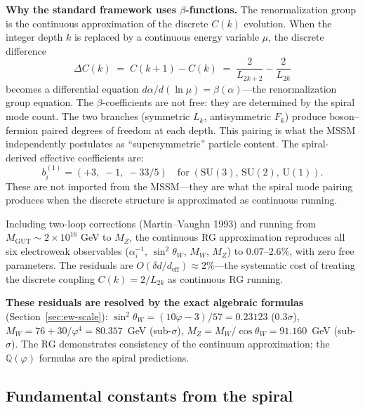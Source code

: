 \documentclass[12pt,a4paper]{article}
\begin{document}
\textbf{Why the standard framework uses $\beta$-functions.} The renormalization group is the continuous approximation of the discrete $C(k)$ evolution. When the integer depth $k$ is replaced by a continuous energy variable $\mu$, the discrete difference
\begin{equation}
\Delta C(k) \;=\; C(k{+}1) - C(k) \;=\; \frac{2}{L_{2k+2}} - \frac{2}{L_{2k}}
\end{equation}
becomes a differential equation $d\alpha/d(\ln\mu) = \beta(\alpha)$---the renormalization group equation. The $\beta$-coefficients are not free: they are determined by the spiral mode count. The two branches (symmetric $L_k$, antisymmetric $F_k$) produce boson--fermion paired degrees of freedom at each depth. This pairing is what the MSSM independently postulates as ``supersymmetric'' particle content. The spiral-derived effective coefficients are:
\begin{equation}
b_i^{(1)} = (+3,\; -1,\; -33/5) \quad \text{for}\; (\mathrm{SU}(3),\, \mathrm{SU}(2),\, \mathrm{U}(1)).
\end{equation}
These are not imported from the MSSM---they are what the spiral mode pairing produces when the discrete structure is approximated as continuous running.

Including two-loop corrections (Martin--Vaughn 1993) and running from $M_{\mathrm{GUT}} \sim 2 \times 10^{16}$ GeV to $M_Z$, the continuous RG approximation reproduces all six electroweak observables ($\alpha_i^{-1}$, $\sin^2\theta_W$, $M_W$, $M_Z$) to $0.07$--$2.6\%$, with zero free parameters.  The residuals are $O(\delta d/d_{\mathrm{eff}}) \approx 2\%$---the systematic cost of treating the discrete coupling $C(k) = 2/L_{2k}$ as continuous RG running.

\textbf{These residuals are resolved by the exact algebraic formulas} (Section~\ref{sec:ew-scale}): $\sin^2\theta_W = (10\varphi{-}3)/57 = 0.23123$ ($0.3\sigma$), $M_W = 76 + 30/\varphi^4 = 80.357$~GeV (sub-$\sigma$), $M_Z = M_W/\cos\theta_W = 91.160$~GeV (sub-$\sigma$).  The RG demonstrates consistency of the continuum approximation; the $\mathbb{Q}(\varphi)$ formulas are the spiral predictions.



\subsection{Fundamental constants from the spiral}
\label{sec:constants}
\end{document}
